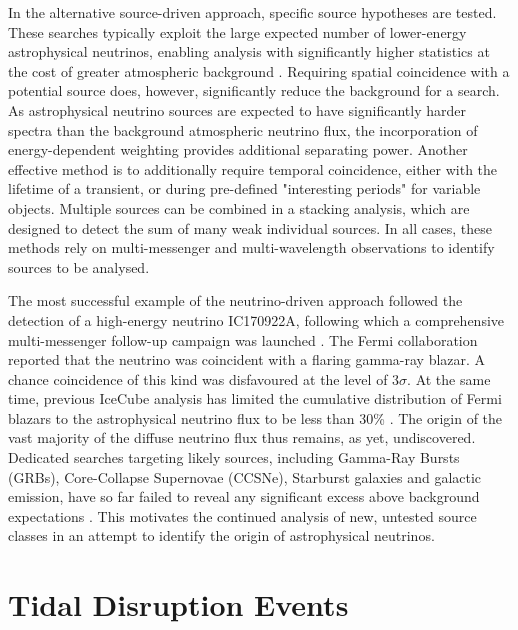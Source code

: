 \documentclass{PoS}
\begin{document}
In the alternative source-driven approach, specific source hypotheses are tested. These searches typically exploit the large expected number of lower-energy astrophysical neutrinos, enabling analysis with significantly higher statistics at the cost of greater atmospheric background \cite{Aartsen:2016oji}. Requiring spatial coincidence with a potential source does, however, significantly reduce the background for a search. As astrophysical neutrino sources are expected to have significantly harder spectra than the background atmospheric neutrino flux, the incorporation of energy-dependent weighting provides additional separating power. Another effective method is to additionally require temporal coincidence, either with the lifetime of a transient, or during  pre-defined "interesting periods" for variable objects.  Multiple sources can be combined in a stacking analysis, which are designed to detect the sum of many weak individual sources. In all cases, these methods rely on multi-messenger and multi-wavelength observations to identify sources to be analysed.

The most successful example of the neutrino-driven approach followed the detection of a high-energy neutrino  IC170922A, following which a comprehensive multi-messenger follow-up campaign was launched \cite{IceCube:2018dnn}. The Fermi collaboration reported that the neutrino was coincident with a flaring gamma-ray blazar. A chance coincidence of this kind was disfavoured at the level of 3$\sigma$. At the same time, previous IceCube analysis has limited the cumulative distribution of Fermi blazars to the astrophysical neutrino flux to be less than 30\% \cite{Aartsen:2016lir}. The origin of the vast majority of the diffuse neutrino flux thus remains, as yet, undiscovered. Dedicated searches targeting likely sources, including Gamma-Ray Bursts (GRBs), Core-Collapse Supernovae (CCSNe), Starburst galaxies and galactic emission, have so far failed to reveal any significant excess above background expectations \cite{Stasik2018Search}. This motivates the continued analysis of new, untested source classes in an attempt to identify the origin of astrophysical neutrinos.

\section{Tidal Disruption Events}
\end{document}
